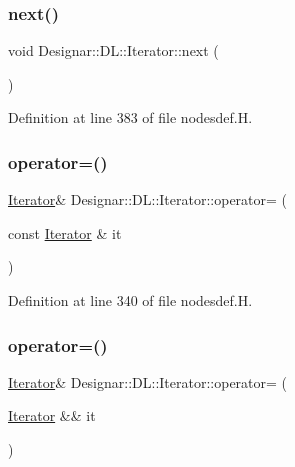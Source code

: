 \subsubsection{\texorpdfstring{next()}{next()}}
{\footnotesize\ttfamily void Designar\+::\+D\+L\+::\+Iterator\+::next (\begin{DoxyParamCaption}{ }\end{DoxyParamCaption})\hspace{0.3cm}{\ttfamily [inline]}}



Definition at line 383 of file nodesdef.\+H.

\mbox{\label{class_designar_1_1_d_l_1_1_iterator_a24c29185e86ef76e7ecb17e9abfd42a9}} 
\subsubsection{\texorpdfstring{operator=()}{operator=()}\hspace{0.1cm}{\footnotesize\ttfamily [1/2]}}
{\footnotesize\ttfamily \hyperlink{class_designar_1_1_d_l_1_1_iterator}{Iterator}\& Designar\+::\+D\+L\+::\+Iterator\+::operator= (\begin{DoxyParamCaption}\item[{const \hyperlink{class_designar_1_1_d_l_1_1_iterator}{Iterator} \&}]{it }\end{DoxyParamCaption})\hspace{0.3cm}{\ttfamily [inline]}}



Definition at line 340 of file nodesdef.\+H.

\mbox{\label{class_designar_1_1_d_l_1_1_iterator_a927bb8ad074ad3021a2d92abfff06fac}} 
\subsubsection{\texorpdfstring{operator=()}{operator=()}\hspace{0.1cm}{\footnotesize\ttfamily [2/2]}}
{\footnotesize\ttfamily \hyperlink{class_designar_1_1_d_l_1_1_iterator}{Iterator}\& Designar\+::\+D\+L\+::\+Iterator\+::operator= (\begin{DoxyParamCaption}\item[{\hyperlink{class_designar_1_1_d_l_1_1_iterator}{Iterator} \&\&}]{it }\end{DoxyParamCaption})\hspace{0.3cm}{\ttfamily [inline]}}




